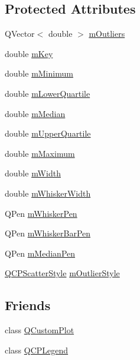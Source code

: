 \subsection*{Protected Attributes}
\begin{DoxyCompactItemize}
\item 
Q\+Vector$<$ double $>$ \hyperlink{classQCPStatisticalBox_a415e2f77a89396c2af999afe027bdf6c}{m\+Outliers}
\item 
double \hyperlink{classQCPStatisticalBox_a86fd1d3be5c5bc11d11eda7517069af4}{m\+Key}
\item 
double \hyperlink{classQCPStatisticalBox_a7143ece4e7e5f9ac010739fbc390bf0c}{m\+Minimum}
\item 
double \hyperlink{classQCPStatisticalBox_acac86cac93d9fa3d820b5aaa04ed96f6}{m\+Lower\+Quartile}
\item 
double \hyperlink{classQCPStatisticalBox_ae43287ca13c8166bde2ac19bf0969d23}{m\+Median}
\item 
double \hyperlink{classQCPStatisticalBox_a865afbcca332ee851aa45807381bc80e}{m\+Upper\+Quartile}
\item 
double \hyperlink{classQCPStatisticalBox_a16266f1e0e4e8e95b5d141c49479ef2e}{m\+Maximum}
\item 
double \hyperlink{classQCPStatisticalBox_af365e40b0f706c3d76f857c7957f629d}{m\+Width}
\item 
double \hyperlink{classQCPStatisticalBox_a4d166474f845d5db626e8b11a0815a6f}{m\+Whisker\+Width}
\item 
Q\+Pen \hyperlink{classQCPStatisticalBox_a25b7552499f0f090fcff02858b2265a5}{m\+Whisker\+Pen}
\item 
Q\+Pen \hyperlink{classQCPStatisticalBox_aa719b1d722a9f82364df1497a6dc1da8}{m\+Whisker\+Bar\+Pen}
\item 
Q\+Pen \hyperlink{classQCPStatisticalBox_a1af5b601049c575f778ae270f40c9443}{m\+Median\+Pen}
\item 
\hyperlink{classQCPScatterStyle}{Q\+C\+P\+Scatter\+Style} \hyperlink{classQCPStatisticalBox_ae102e4187e1e6ba1f2df0f622b5171a4}{m\+Outlier\+Style}
\end{DoxyCompactItemize}
\subsection*{Friends}
\begin{DoxyCompactItemize}
\item 
class \hyperlink{classQCPStatisticalBox_a1cdf9df76adcfae45261690aa0ca2198}{Q\+Custom\+Plot}
\item 
class \hyperlink{classQCPStatisticalBox_a8429035e7adfbd7f05805a6530ad5e3b}{Q\+C\+P\+Legend}
\end{DoxyCompactItemize}
